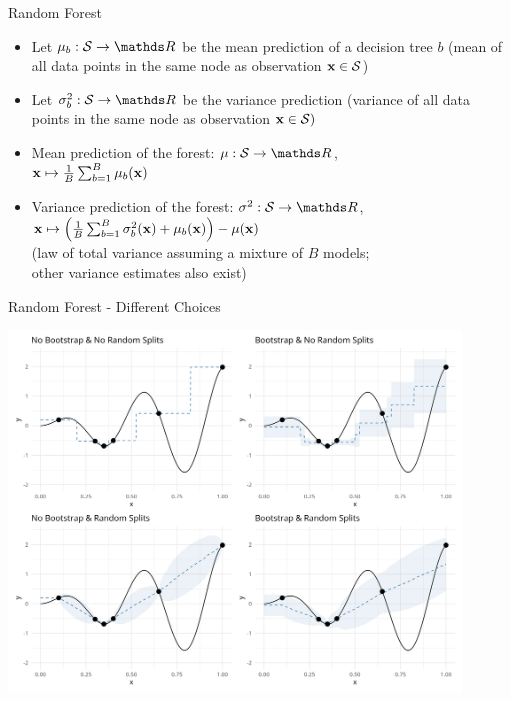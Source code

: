 \documentclass[11pt,compress,t,notes=noshow, xcolor=table]{beamer}
\begin{document}
\begin{frame}{Random Forest}

\begin{itemize}
    \item Let $\mu_b: \mathcal{S} \to \R$ be the mean prediction of a decision tree $b$ (mean of all data points in the same node as observation $\mathbf{x} \in \mathcal{S}$)
    \item Let $\sigma_{b}^2: \mathcal{S} \to \R$ be the variance prediction (variance of all data points in the same node as observation $\mathbf{x} \in \mathcal{S})$
    \item Mean prediction of the forest: $\mu: \mathcal{S} \to \R$,\\
    $\mathbf{x} \mapsto \frac{1}{B} \sum_{b = 1}^{B} \mu_{b}(\mathbf{x})$
    \item Variance prediction of the forest: $\sigma^{2}: \mathcal{S} \to \R$,\\
    $\mathbf{x} \mapsto  \left( \frac{1}{B} \sum_{b = 1}^{B} \sigma_{b}^2(\mathbf{x}) + \mu_{b}(\mathbf{x}) \right) - \mu(\mathbf{x})$\\
    (law of total variance assuming a mixture of $B$ models;\\
    other variance estimates also exist)
\end{itemize}

\end{frame}


\begin{frame}{Random Forest - Different Choices}

\begin{center}
  \includegraphics[width = 0.9\textwidth]{figure_man/surrogate_2.png}\\
\end{center}

\end{frame}
\end{document}

